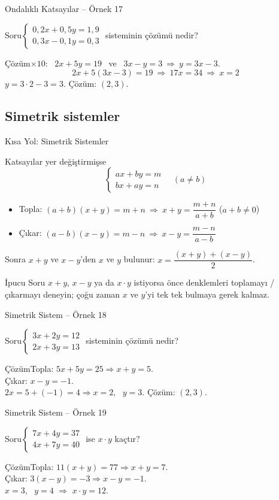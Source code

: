\documentclass[aspectratio=169,11pt]{beamer}
\newcommand{\soru}[3]{%
\begin{frame}{#1}
  \begin{block}{Soru}\large #2\end{block}
  \pause
  \begin{exampleblock}{Çözüm}\large #3\end{exampleblock}
\end{frame}}
\begin{document}
\soru{Ondalıklı Katsayılar -- Örnek 17}
{\(\begin{cases}0{,}2x+0{,}5y=1{,}9\\ 0{,}3x-0{,}1y=0{,}3\end{cases}\) \quad sisteminin çözümü nedir?}
{\(\times 10\): \ \(2x+5y=19\) \ ve \ \(3x-y=3\ \Rightarrow\ y=3x-3\).
\[2x+5(3x-3)=19\ \Rightarrow\ 17x=34\ \Rightarrow\ x=2\]
\(y=3\cdot 2-3=3\). \quad Çözüm: \((2,3)\).}

\subsection{Simetrik sistemler}
\begin{frame}{Kısa Yol: Simetrik Sistemler}
\begin{block}{Katsayılar yer değiştirmişse}
\[\begin{cases}ax+by=m\\ bx+ay=n\end{cases}\quad(a\neq b)\]
\begin{itemize}
\item Topla: \((a+b)(x+y)=m+n\ \Rightarrow\ x+y=\dfrac{m+n}{a+b}\) \quad (\(a+b\neq 0\))
\item Çıkar: \((a-b)(x-y)=m-n\ \Rightarrow\ x-y=\dfrac{m-n}{a-b}\)
\end{itemize}
Sonra \(x+y\) ve \(x-y\)'den \(x\) ve \(y\) bulunur: \(x=\dfrac{(x+y)+(x-y)}{2}\).
\end{block}
\begin{alertblock}{İpucu}
Soru \(x+y\), \(x-y\) ya da \(x\cdot y\) istiyorsa önce denklemleri toplamayı / çıkarmayı deneyin; çoğu zaman \(x\) ve \(y\)'yi tek tek bulmaya gerek kalmaz.
\end{alertblock}
\end{frame}

\soru{Simetrik Sistem -- Örnek 18}
{\(\begin{cases}3x+2y=12\\ 2x+3y=13\end{cases}\) \quad sisteminin çözümü nedir?}
{Topla: \(5x+5y=25\Rightarrow x+y=5\).\\[3pt]
Çıkar: \(x-y=-1\).\\[3pt]
\(2x=5+(-1)=4\Rightarrow x=2\), \ \(y=3\). \quad Çözüm: \((2,3)\).}

\soru{Simetrik Sistem -- Örnek 19}
{\(\begin{cases}7x+4y=37\\ 4x+7y=40\end{cases}\) \quad ise \(x\cdot y\) kaçtır?}
{Topla: \(11(x+y)=77\Rightarrow x+y=7\).\\[3pt]
Çıkar: \(3(x-y)=-3\Rightarrow x-y=-1\).\\[3pt]
\(x=3\), \ \(y=4\) \(\Rightarrow\) \(x\cdot y=12\).}
\end{document}
